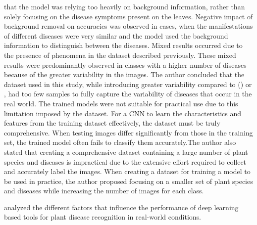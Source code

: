 \documentclass{BachelorBUI}
\begin{document}
that the model was relying too heavily on background information, rather than solely focusing on the disease symptoms present on the leaves. Negative impact of background removal on accuracies was observed in cases, when the manifestations of different diseases were very similar and the model used the background information to distinguish between the diseases. Mixed results occurred due to the presence of phenomena in the dataset described previously. These mixed results were predominantly observed in classes with a higher number of diseases because of the greater variability in the images. The author concluded that the dataset used in this study, while introducing greater variability compared to  (\cite{Mohanty:2016}) or \cite{Ferentinos:2018}, had too few samples to fully capture the variability of diseases that occur in the real world. The trained models were not suitable for practical use due to this limitation imposed by the dataset. For a CNN to learn the characteristics and features from the training dataset effectively, the dataset must be truly comprehensive. When testing images differ significantly from those in the training set, the trained model often fails to classify them accurately.The author also stated that creating a comprehensive dataset containing a large number of plant species and diseases is impractical due to the extensive effort required to collect and accurately label the images. When creating a dataset for training a model to be used in practice, the author proposed focusing on a smaller set of plant species and diseases while increasing the number of images for each class. 

\textcite{Barbedo:2018:2} analyzed the different factors that influence the performance of deep learning based tools for plant disease recognition in real-world conditions. 
\end{document}
